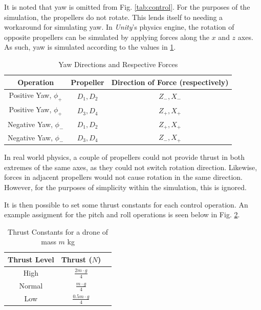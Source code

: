 \documentclass[12pt]{article}
\begin{document}
It is noted that yaw is omitted from Fig. \ref{tab:control}. For the purposes of the simulation, the propellers do not rotate. This lends itself to needing a workaround for simulating yaw. In \emph{Unity}'s physics engine, the rotation of opposite propellers can be simulated by applying forces along the $x$ and $z$ axes. As such, yaw is simulated according to the values in \ref{tab:yaw-control}.

\begin{table}[H]
    \begin{center}
    \begin{tabular}{| c | c | c |} 
    \hline
    Operation & Propeller & Direction of Force (respectively) \\ 
    \hline
    Positive Yaw, $\phi_+$ & $D_1, D_2$ & $Z_-, X_-$ \\
    \hline
    Positive Yaw, $\phi_+$ & $D_3, D_4$ & $Z_+, X_+$ \\
    \hline
    Negative Yaw, $\phi_-$ & $D_1, D_2$ & $Z_+, X_+$ \\
    \hline
    Negative Yaw, $\phi_-$ & $D_3, D_4$ & $Z_-, X_+$ \\
    \hline
    \end{tabular}
    \end{center}
    \caption{Yaw Directions and Respective Forces}
    \label{tab:yaw-control}
\end{table}

In real world physics, a couple of propellers could not provide thrust in both extremes of the same axes, as they could not switch rotation direction. Likewise, forces in adjacent propellers would not cause rotation in the same direction. However, for the purposes of simplicity within the simulation, this is ignored.

It is then possible to set some thrust constants for each control operation. An example assigment for the pitch and roll operations is seen below in Fig. \ref{tab:thrust-constants}.

\begin{table}[H]
    \begin{center}
    \begin{tabular}{| c | c | c |} 
    \hline
    Thrust Level & Thrust ($N$) \\ 
    \hline
    High & $\frac{2m \cdot g}{4}$\\
    \hline
    Normal & $\frac{m \cdot g}{4}$\\
    \hline
    Low & $\frac{0.5m \cdot g}{4}$\\
    \hline
    \end{tabular}
    \end{center}
    \caption{Thrust Constants for a drone of mass $m$ kg}
    \label{tab:thrust-constants}
\end{table}
\end{document}
